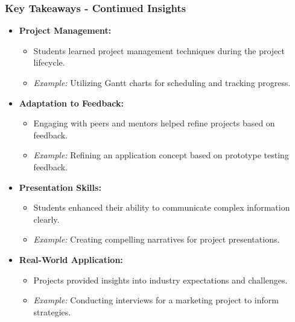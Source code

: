 \documentclass[aspectratio=169]{beamer}
\begin{document}
\begin{frame}[fragile]
  \frametitle{Key Takeaways - Continued Insights}
  \begin{itemize}
    \item \textbf{Project Management:} 
    \begin{itemize}
      \item Students learned project management techniques during the project lifecycle.
      \item \textit{Example:} Utilizing Gantt charts for scheduling and tracking progress.
    \end{itemize}
    
    \item \textbf{Adaptation to Feedback:} 
    \begin{itemize}
      \item Engaging with peers and mentors helped refine projects based on feedback.
      \item \textit{Example:} Refining an application concept based on prototype testing feedback.
    \end{itemize}
    
    \item \textbf{Presentation Skills:} 
    \begin{itemize}
      \item Students enhanced their ability to communicate complex information clearly.
      \item \textit{Example:} Creating compelling narratives for project presentations.
    \end{itemize}

    \item \textbf{Real-World Application:} 
    \begin{itemize}
      \item Projects provided insights into industry expectations and challenges.
      \item \textit{Example:} Conducting interviews for a marketing project to inform strategies.
    \end{itemize}
  \end{itemize}
\end{frame}
\end{document}
